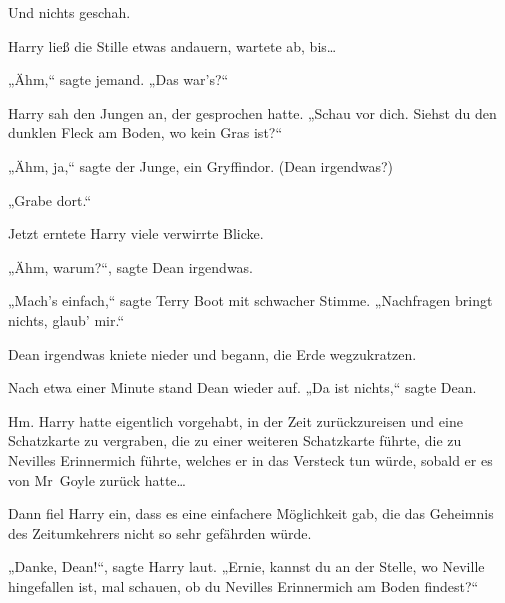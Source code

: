 Und nichts geschah.

Harry ließ die Stille etwas andauern, wartete ab, bis…

„Ähm,“ sagte jemand. „Das war’s?“

Harry sah den Jungen an, der gesprochen hatte. „Schau vor dich. Siehst du den dunklen Fleck am Boden, wo kein Gras ist?“

„Ähm, ja,“ sagte der Junge, ein Gryffindor. (Dean irgendwas?)

„Grabe dort.“

Jetzt erntete Harry viele verwirrte Blicke.

„Ähm, warum?“, sagte Dean irgendwas.

„Mach’s einfach,“ sagte Terry Boot mit schwacher Stimme. „Nachfragen bringt nichts, glaub’ mir.“

Dean irgendwas kniete nieder und begann, die Erde wegzukratzen.

Nach etwa einer Minute stand Dean wieder auf. „Da ist nichts,“ sagte Dean.

Hm. Harry hatte eigentlich vorgehabt, in der Zeit zurückzureisen und eine Schatzkarte zu vergraben, die zu einer weiteren Schatzkarte führte, die zu Nevilles Erinnermich führte, welches er in das Versteck tun würde, sobald er es von Mr~Goyle zurück hatte…

Dann fiel Harry ein, dass es eine einfachere Möglichkeit gab, die das Geheimnis des Zeitumkehrers nicht so sehr gefährden würde.

„Danke, Dean!“, sagte Harry laut. „Ernie, kannst du an der Stelle, wo Neville hingefallen ist, mal schauen, ob du Nevilles Erinnermich am Boden findest?“

